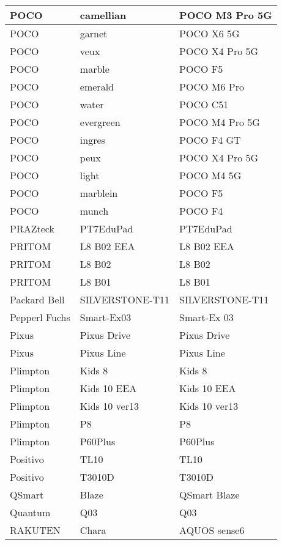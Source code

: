 \begin{tabularx}{\linewidth}{|l|X|X|}
        POCO & camellian & POCO M3 Pro 5G \\ \hline
        POCO & garnet & POCO X6 5G \\ \hline
        POCO & veux & POCO X4 Pro 5G \\ \hline
        POCO & marble & POCO F5 \\ \hline
        POCO & emerald & POCO M6 Pro \\ \hline
        POCO & water & POCO C51 \\ \hline
        POCO & evergreen & POCO M4 Pro 5G \\ \hline
        POCO & ingres & POCO F4 GT \\ \hline
        POCO & peux & POCO X4 Pro 5G \\ \hline
        POCO & light & POCO M4 5G \\ \hline
        POCO & marblein & POCO F5 \\ \hline
        POCO & munch & POCO F4 \\ \hline
        PRAZteck & PT7EduPad & PT7EduPad \\ \hline
        PRITOM & L8 B02 EEA & L8 B02 EEA \\ \hline
        PRITOM & L8 B02 & L8 B02 \\ \hline
        PRITOM & L8 B01 & L8 B01 \\ \hline
        Packard Bell & SILVERSTONE-T11 & SILVERSTONE-T11 \\ \hline
        Pepperl Fuchs & Smart-Ex03 & Smart-Ex 03 \\ \hline
        Pixus & Pixus Drive & Pixus Drive \\ \hline
        Pixus & Pixus Line & Pixus Line \\ \hline
        Plimpton & Kids 8 & Kids 8 \\ \hline
        Plimpton & Kids 10 EEA & Kids 10 EEA \\ \hline
        Plimpton & Kids 10 ver13 & Kids 10 ver13 \\ \hline
        Plimpton & P8 & P8 \\ \hline
        Plimpton & P60Plus & P60Plus \\ \hline
        Positivo & TL10 & TL10 \\ \hline
        Positivo & T3010D & T3010D \\ \hline
        QSmart & Blaze & QSmart Blaze \\ \hline
        Quantum & Q03 & Q03 \\ \hline
        RAKUTEN & Chara & AQUOS sense6 \\ \hline

\end{tabularx}
